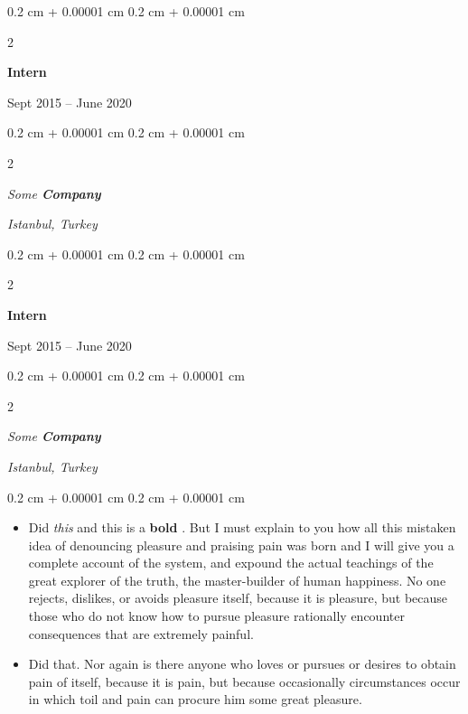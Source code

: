 \documentclass[10pt, letterpaper]{article}
\newenvironment{highlights}{
    \begin{itemize}[
        topsep=0.10 cm,
        parsep=0.10 cm,
        partopsep=0pt,
        itemsep=0pt,
        leftmargin=0.4 cm + 10pt
    ]
}{
    \end{itemize}
} %
\newenvironment{onecolentry}{
    \begin{adjustwidth}{
        0.2 cm + 0.00001 cm
    }{
        0.2 cm + 0.00001 cm
    }
}{
    \end{adjustwidth}
} %
\newenvironment{twocolentry}[2][]{
    \onecolentry
    \def\secondColumn{#2}
    \setcolumnwidth{\fill, 4.5 cm}
    \begin{paracol}{2}
}{
    \switchcolumn \raggedleft \secondColumn
    \end{paracol}
    \endonecolentry
} %
\let\hrefWithoutArrow\href
\renewcommand{\href}[2]{\hrefWithoutArrow{#1}{\ifthenelse{\equal{#2}{}}{ }{#2 }\raisebox{.15ex}{\footnotesize \faExternalLink*}}}
\begin{document}
        \vspace{0.2 cm}

                \begin{twocolentry}{
                    Sept 2015 – June 2020
                }
                \textbf{Intern}
                \end{twocolentry}
            \begin{twocolentry}{
        \textit{Istanbul, Turkey}    }
            \textit{Some \textbf{Company}}
            \end{twocolentry}



        \vspace{0.2 cm}

                \begin{twocolentry}{
                    Sept 2015 – June 2020
                }
                \textbf{Intern}
                \end{twocolentry}
            \begin{twocolentry}{
        \textit{Istanbul, Turkey}    }
            \textit{Some \textbf{Company}}
            \end{twocolentry}

        \vspace{0.10 cm}
        \begin{onecolentry}
            \begin{highlights}
                \item Did \textit{this} and this is a \textbf{bold} \href{https://example.com}{link}. But I must explain to you how all this mistaken idea of denouncing pleasure and praising pain was born and I will give you a complete account of the system, and expound the actual teachings of the great explorer of the truth, the master-builder of human happiness. No one rejects, dislikes, or avoids pleasure itself, because it is pleasure, but because those who do not know how to pursue pleasure rationally encounter consequences that are extremely painful.
                \item Did that. Nor again is there anyone who loves or pursues or desires to obtain pain of itself, because it is pain, but because occasionally circumstances occur in which toil and pain can procure him some great pleasure.
            \end{highlights}
        \end{onecolentry}


        \vspace{0.2 cm}
\end{document}
